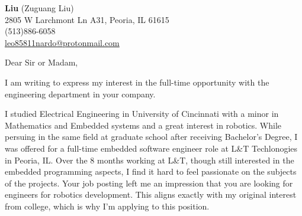 \documentclass[11pt]{letter} %
\begin{document}

\begin{letter}
    {\vspace{-15pt}}


    \begin{center}
        \large \textbf{Liu} (Zuguang Liu) \\ %
        2805 W Larchmont Ln A31, Peoria, IL 61615 \\
        (513)886-6058 \\
        \href{mailto:leo85811nardo@protonmail.com}{leo85811nardo@protonmail.com}
    \end{center}


    \signature{Liu (Zuguang Liu)} %


    \opening{Dear Sir or Madam,}

    \par I am writing to express my interest in the full-time opportunity with the engineering department in your company.

    \par I studied Electrical Engineering in University of Cincinnati
    with a minor in Mathematics and Embedded systems and a great interest
    in robotics.
    While persuing in the same field at graduate school after receiving
    Bachelor's Degree, I was offered for a full-time embedded software engineer
    role at L\&T Techlonogies in Peoria, IL.
    Over the 8 months working at L\&T, though still interested in the embedded
    programming aspects, I find it hard to feel passionate on the subjects of
    the projects.
    Your job posting left me an impression that you are looking for engineers
    for robotics development.
    This aligns exactly with my original interest from college, which is why
    I'm applying to this position.


\end{letter}
\end{document}
